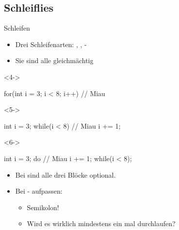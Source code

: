 \subsection{Schleiflies}
\begin{frame}[fragile]{Schleifen}
   \vspace*{-.75\baselineskip}\begin{itemize}[<+(1)->]
      \itemsep5pt
      \item Drei Schleifenarten: , , -
      \item Sie sind alle gleichmächtig\vspace*{-7.125\baselineskip}
   \end{itemize}
\begin{layout-imageonly}
\columns[onlytextwidth,t]
\begin{uncoverenv}<4->
\begin{plainjava}
for(int i = 3; i < 8; i++) {
   // Miau
}
\end{plainjava}
\end{uncoverenv}
\begin{uncoverenv}<5->
\begin{plainjava}
int i = 3;
while(i < 8) {
   // Miau
   i += 1;
}
\end{plainjava}
\end{uncoverenv}
\begin{uncoverenv}<6->
\begin{plainjava}
int i = 3;
do {
   // Miau
   i += 1;
} while(i < 8);
\end{plainjava}
\end{uncoverenv}
\endcolumns
\columns[onlytextwidth,c]
\endcolumns
\vspace*{-6.4\baselineskip}
\end{layout-imageonly}
\begin{itemize}
   \itemsep5pt
   \item<10-> Bei  sind alle drei Blöcke optional.
   \item<11-> Bei - aufpassen: \begin{itemize}
      \item<12-> Semikolon!
      \item<13-> Wird es wirklich mindestens ein mal durchlaufen?
   \end{itemize}
\end{itemize}
\end{frame}


